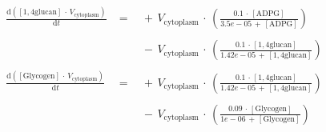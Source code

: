 $$\begin{array}{ccl}
 && \\ 
\frac {\mathrm{d}\left( {{\mathrm{[1,4glucan]}} \, \cdot \, {V}_{\mathrm{cytoplasm}} } \right) }  {\mathrm{d}{t} }  \; &=& \;  { \, + \, {V}_{\mathrm{cytoplasm}} \, \cdot \, \left(\frac {{0.1} \, \cdot \, {\mathrm{[ADPG]}} }  {{3.5e-05} \, + \, {\mathrm{[ADPG]}} } \right) } \\ 
 && \\ 
 \; && \;  { \, - \, {V}_{\mathrm{cytoplasm}} \, \cdot \, \left(\frac {{0.1} \, \cdot \, {\mathrm{[1,4glucan]}} }  {{1.42e-05} \, + \, {\mathrm{[1,4glucan]}} } \right) } \\ 
 && \\ 
\frac {\mathrm{d}\left( {{\mathrm{[Glycogen]}} \, \cdot \, {V}_{\mathrm{cytoplasm}} } \right) }  {\mathrm{d}{t} }  \; &=& \;  { \, + \, {V}_{\mathrm{cytoplasm}} \, \cdot \, \left(\frac {{0.1} \, \cdot \, {\mathrm{[1,4glucan]}} }  {{1.42e-05} \, + \, {\mathrm{[1,4glucan]}} } \right) } \\ 
 && \\ 
 \; && \;  { \, - \, {V}_{\mathrm{cytoplasm}} \, \cdot \, \left(\frac {{0.09} \, \cdot \, {\mathrm{[Glycogen]}} }  {{1e-06} \, + \, {\mathrm{[Glycogen]}} } \right) } \\ 
 && \\ 
\end{array}
$$